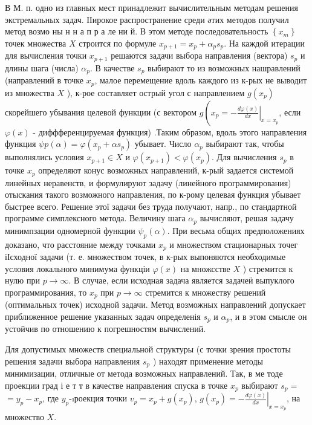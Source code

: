 \documentclass[10pt]{article}
\begin{document}
В М. п. одно из главных мест принадлежит вычислительным методам решения экстремальных задач. ІІирокое распространение среди әтих методов получил метод возмо ны н н а п р а ле ни й. В этом методе последовательность $\left\{x_{m}\right\}$ точек множества $X$ строится по формуле $x_{p+1}=x_{p}+\alpha_{p} s_{p}$. На каждой итерации для вычисления точки $x_{p+1}$ решаются задачи выбора направления (вектора) $s_{p}$ и длины шага (числа) $\alpha_{p}$. В качестве $s_{p}$ выбирают то из возможных нашравлений (направлений в точке $x_{p}$, малое перемещение вдоль каждого из к-рых не выводит из множества $X$ ), к-рое составляет острый угол с направлением $g\left(x_{p}\right)$ скорейшего убывания целевой функции (с вектором $g\left(x_{p}=-\left.\frac{d \varphi(x)}{d x}\right|_{x=x_{p}}\right.$, если $\varphi(x)$ - диффференцируемая функция) .Таким образом, вдоль этого направления функция $\psi p(\alpha)=\varphi\left(x_{p}+\alpha s_{p}\right)$ убывает. Число $\alpha_{p}$ выбирают так, чтобы выполнялись условия $x_{p+1} \in X$ и $\varphi\left(x_{p+1}\right)<\varphi\left(x_{p}\right)$. Для вычисления $s_{p}$ в точке $x_{p}$ определяют конус возможных направлений, к-рый задается системой линейных неравенств, и формулируют задачу (линейного программирования) отыскания такого возможного направления, по к-рому целевая функция убывает быстрее всего. Решение этої задачи без труда получают, напр., по стандартной программе симплексного метода. Величину шага $\alpha_{p}$ вычисляют, решая задачу минимпзации одномерной функции $\psi_{p}(\alpha)$. При весьма общих предположениях доказано, что расстояние между точками $x_{p}$ и множеством стационарных точег іІсходної задачи (т. е. множеством точек, в к-рых выпоняются необходимые условия локального минимума функціи $\varphi(x)$ на множсстве $X$ ) стремится к нулю при $p \rightarrow \infty$. В случае, если исходная задача является задачеӥ выпуклого программирования, то $x_{p}$ при $p \rightarrow \infty$ стремится к множеству решений (оптимальных точек) исходной задачи. Метод возможных направлений допускает приближенное решение указанных задач определенія $s_{p}$ и $\alpha_{p}$, и в этом смысле он устойчив по отношению к погрешностям вычислений.



Для допустимых множеств специальной структуры (с точки зрения простоты решения задачи выбора направления $s_{p}$ ) находят применение методы минимизации, отличные от метода возможных направлений. Так, в ме тоде проекции град і е т т в качестве направления спуска в точке $x_{p}$ выбирают $s_{p}=$ $=y_{p}-x_{p}$, где $y_{p}$-ıроекция точки $v_{p}=x_{p}+g\left(x_{p}\right)$, $g\left(x_{p}\right)=-\left.\frac{d \varphi(x)}{d x}\right|_{x=x_{p}}$, на множество $X$.
\end{document}
